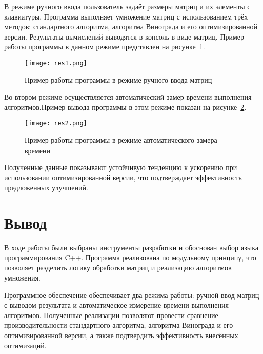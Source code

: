 В режиме ручного ввода пользователь задаёт размеры матриц и их элементы с клавиатуры. 
Программа выполняет умножение матриц с использованием трёх методов: стандартного алгоритма, алгоритма Винограда и его оптимизированной версии. 
Результаты вычислений выводятся в консоль в виде матриц. 
Пример работы программы в данном режиме представлен на рисунке~\ref{fig:mode1}.  

\begin{figure}[H]
	\centering
	\texttt{[image: res1.png]}
	\caption{Пример работы программы в режиме ручного ввода матриц}
	\label{fig:mode1}
\end{figure}

Во втором режиме осуществляется автоматический замер времени выполнения алгоритмов.Пример вывода программы в этом режиме показан на рисунке~\ref{fig:mode2}.  

\begin{figure}[H]
	\centering
	\texttt{[image: res2.png]}
	\caption{Пример работы программы в режиме автоматического замера времени}
	\label{fig:mode2}
\end{figure}

Полученные данные показывают устойчивую тенденцию к ускорению при использовании оптимизированной версии, что подтверждает эффективность предложенных улучшений.

\section*{Вывод}

В ходе работы были выбраны инструменты разработки и обоснован выбор языка программирования C++. 
Программа реализована по модульному принципу, что позволяет разделить логику обработки матриц и реализацию алгоритмов умножения.  

Программное обеспечение обеспечивает два режима работы: 
ручной ввод матриц с выводом результата и автоматическое измерение времени выполнения алгоритмов.  
Полученные реализации позволяют провести сравнение производительности стандартного алгоритма, алгоритма Винограда и его оптимизированной версии, а также подтвердить эффективность внесённых оптимизаций.

\clearpage

